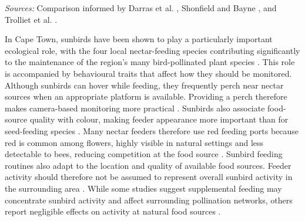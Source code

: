 \begin{table}[htbp]
\begin{tabularx}{\textwidth}{
        >{\raggedright\arraybackslash}p{}
        >{\raggedright\arraybackslash}X
        >{\raggedright\arraybackslash}X
        >{\raggedright\arraybackslash}p{}
    }
        \bottomrule
    \end{tabularx}
    
    \vspace{0.5em}
    
    \begin{minipage}{0.96\textwidth}
        \footnotesize
        \textit{Sources:} Comparison informed by Darras et al. 
        \cite{DarrasEtAl2018}, Shonfield and Bayne 
        \cite{ShonfieldBayne2017}, and Trolliet et al. 
        \cite{TrollietEtAl2014}.
    \end{minipage}
\end{table}

\par\vspace{6pt}
In Cape Town, sunbirds have been shown to play a particularly important ecological role, with the four local nectar-feeding species contributing significantly to the maintenance of the region's many bird-pollinated plant species \cite{GeertsEtAl2020}. This role is accompanied by behavioural traits that affect how they should be monitored. Although sunbirds can hover while feeding, they frequently perch near nectar sources when an appropriate platform is available. Providing a perch therefore makes camera-based monitoring more practical \cite{SejfovaEtAl2021}. Sunbirds also associate food-source quality with colour, making feeder appearance more important than for seed-feeding species \cite{WhitfieldEtAl2014}. Many nectar feeders therefore use red feeding ports because red is common among flowers, highly visible in natural settings and less detectable to bees, reducing competition at the food source \cite{ChenEtAl2020}. Sunbird feeding routines also adapt to the location and quality of available food sources. Feeder activity should therefore not be assumed to represent overall sunbird activity in the surrounding area \cite{DuPlessisEtAl2021}. While some studies suggest supplemental feeding may concentrate sunbird activity and affect surrounding pollination networks, others report negligible effects on activity at natural food sources \cite{DuPlessisEtAl2021, MantintsililiEtAl2025}.
\par\vspace{6pt}
